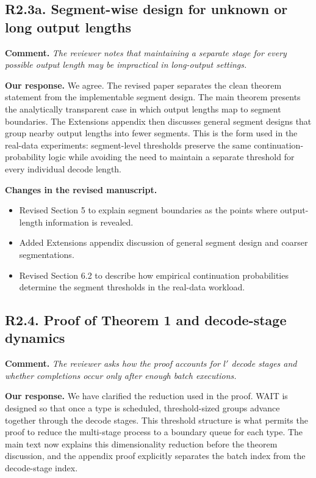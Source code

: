 \documentclass[11pt]{article}
\newcommand{\comment}[1]{%
  \vspace{0.25em}
  \noindent\textbf{Comment.} \emph{#1}
}
\newcommand{\response}{\vspace{0.25em}\noindent\textbf{Our response.} }
\newcommand{\changes}{\vspace{0.25em}\noindent\textbf{Changes in the revised manuscript.} }
\begin{document}
\subsection*{R2.3a. Segment-wise design for unknown or long output lengths}

\comment{The reviewer notes that maintaining a separate stage for every possible output length may be impractical in long-output settings.}

\response We agree. The revised paper separates the clean theorem statement from the implementable segment design. The main theorem presents the analytically transparent case in which output lengths map to segment boundaries. The Extensions appendix then discusses general segment designs that group nearby output lengths into fewer segments. This is the form used in the real-data experiments: segment-level thresholds preserve the same continuation-probability logic while avoiding the need to maintain a separate threshold for every individual decode length.

\changes
\begin{itemize}
    \item Revised Section 5 to explain segment boundaries as the points where output-length information is revealed.
    \item Added Extensions appendix discussion of general segment design and coarser segmentations.
    \item Revised Section 6.2 to describe how empirical continuation probabilities determine the segment thresholds in the real-data workload.
\end{itemize}

\subsection*{R2.4. Proof of Theorem 1 and decode-stage dynamics}

\comment{The reviewer asks how the proof accounts for \(l'\) decode stages and whether completions occur only after enough batch executions.}

\response We have clarified the reduction used in the proof. WAIT is designed so that once a type is scheduled, threshold-sized groups advance together through the decode stages. This threshold structure is what permits the proof to reduce the multi-stage process to a boundary queue for each type. The main text now explains this dimensionality reduction before the theorem discussion, and the appendix proof explicitly separates the batch index from the decode-stage index.
\end{document}

